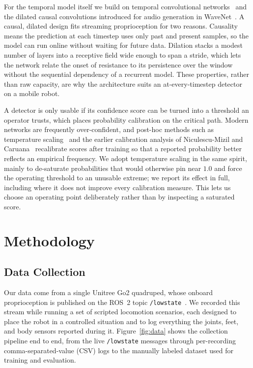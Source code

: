 \documentclass[conference]{IEEEtran}
\begin{document}
For the temporal model itself we build on temporal convolutional networks~\cite{bai2018tcn} and the dilated causal convolutions introduced for audio generation in WaveNet~\cite{oord2016wavenet}. A causal, dilated design fits streaming proprioception for two reasons. Causality means the prediction at each timestep uses only past and present samples, so the model can run online without waiting for future data. Dilation stacks a modest number of layers into a receptive field wide enough to span a stride, which lets the network relate the onset of resistance to its persistence over the window without the sequential dependency of a recurrent model. These properties, rather than raw capacity, are why the architecture suits an at-every-timestep detector on a mobile robot.

A detector is only usable if its confidence score can be turned into a threshold an operator trusts, which places probability calibration on the critical path. Modern networks are frequently over-confident, and post-hoc methods such as temperature scaling~\cite{guo2017calibration} and the earlier calibration analysis of Niculescu-Mizil and Caruana~\cite{niculescu2005predicting} recalibrate scores after training so that a reported probability better reflects an empirical frequency. We adopt temperature scaling in the same spirit, mainly to de-saturate probabilities that would otherwise pin near $1.0$ and force the operating threshold to an unusable extreme; we report its effect in full, including where it does not improve every calibration measure. This lets us choose an operating point deliberately rather than by inspecting a saturated score.

\section{Methodology}
\label{sec:method}
\subsection{Data Collection}

Our data come from a single Unitree Go2 quadruped, whose onboard proprioception is published on the ROS~2 topic \texttt{/lowstate}~\cite{macenski2022ros2,unitree_go2}. We recorded this stream while running a set of scripted locomotion scenarios, each designed to place the robot in a controlled situation and to log everything the joints, feet, and body sensors reported during it. Figure~\ref{fig:data} shows the collection pipeline end to end, from the live \texttt{/lowstate} messages through per-recording comma-separated-value (CSV) logs to the manually labeled dataset used for training and evaluation.
\end{document}
